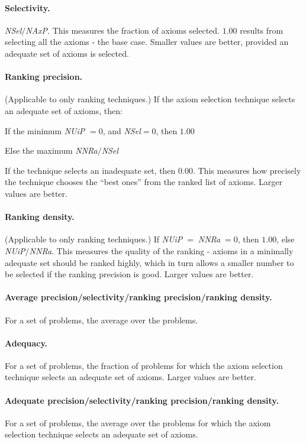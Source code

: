 \documentclass[EPiC]{easychair}
\newenvironment{packed_itemize}{
\vspace*{-0.5em}
\begin{itemize}
  \setlength{\partopsep}{0pt}
  \setlength{\itemsep}{1pt}
  \setlength{\parskip}{0pt}
  \setlength{\parsep}{0pt}
}{\end{itemize}}
\begin{document}
\paragraph{Selectivity.}
\emph{NSel}$/$\emph{NAxP}.
This measures the fraction of axioms selected.
$1.00$ results from selecting all the axioms - the base case.
Smaller values are better, provided an adequate set of axioms is selected.

\paragraph{Ranking precision.}
(Applicable to only ranking techniques.)
If the axiom selection technique selects an adequate set of axioms, then:
\begin{packed_itemize}
\item If the minimum \emph{NUiP} $= 0$, and \emph{NSel}$ = 0$, then $1.00$
\item Else the maximum \emph{NNRa}$/$\emph{NSel}
\end{packed_itemize}
If the technique selects an inadequate set, then $0.00$.
This measures how precisely the technique chooses the ``best ones'' from
the ranked list of axioms.
Larger values are better.

\paragraph{Ranking density.}
(Applicable to only ranking techniques.)
If \emph{NUiP}$\;=\;$\emph{NNRa}$\;= 0$, then $1.00$, else
\emph{NUiP}$/$\emph{NNRa}.
This measures the quality of the ranking - axioms in a minimally adequate 
set should be ranked highly, which in turn allows a smaller number to be 
selected if the ranking precision is good.
Larger values are better.

\paragraph{Average precision/selectivity/ranking precision/ranking density.}
For a set of problems, the average over the problems.

\paragraph{Adequacy.}
For a set of problems, the fraction of problems for which the axiom 
selection technique selects an adequate set of axioms.
Larger values are better.

\paragraph{Adequate precision/selectivity/ranking precision/ranking density.}
For a set of problems, the average over the problems for which the axiom
selection technique selects an adequate set of axioms.
\end{document}
